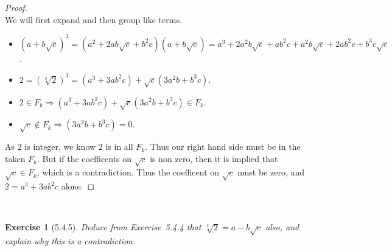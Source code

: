 \documentclass[12pt]{article}
\newcommand{\XB}{\color{black}}
\newcommand{\XBB}{\color{blue}}
\newcommand{\ds}{\displaystyle}
\theoremstyle{plain}
\newtheorem{ex}{Exercise}
\begin{document}
\begin{proof}
  \ \\

  We will first expand and then group like terms.

  \begin{itemize}
    \item $ \ds (a + b\sqrt{c})^{3} = (a^{2} + 2ab\sqrt{c} + b^{2}c)(a+b\sqrt{c}) = a^{3} + 2a^{2}b\sqrt{c} + ab^{2}c + a^{2}b\sqrt{c} + 2ab^{2}c + b^{3}c\sqrt{c} $.
    \item $ \ds 2 = (\sqrt[3]{2})^{3} = (a^{3} + 3ab^{2}c) + \sqrt{c}(3a^{2}b + b^{3}c) $.
    \item $ \ds 2 \in F_{k} \Rightarrow (a^{3} + 3ab^{2}c) + \sqrt{c}(3a^{2}b + b^{3}c) \in F_{k} $.
    \item $ \ds \sqrt{c} \notin F_{k} \Rightarrow (3a^{2}b + b^{3}c) = 0 $.
  \end{itemize}

  As $ 2 $ is integer, we know $ 2 $ is in all $ F_{k} $. 
  Thus our right hand side must be in the taken $ F_{k} $. 
  But if the coefficents on $ \sqrt{c} $ is non zero, then it is implied that $ \sqrt{c} \in F_{k} $, which is a contradiction.
  Thus the coefficent on $ \sqrt{c} $ must be zero, and $ 2 = a^{3} + 3ab^{2}c $ alone.

\end{proof}

\newpage

\XBB\hrulefill\XB \\
\begin{ex} [5.4.5]
  Deduce from Exercise~5.4.4 that $ \sqrt[3]{2} = a - b\sqrt{c} $ also, and explain why this is a contradiction.
\end{ex}
\XBB\hrulefill\XB \\
\end{document}
